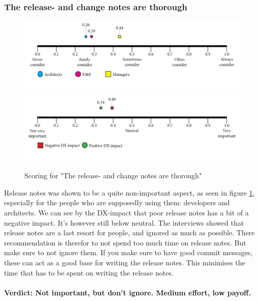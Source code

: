 \documentclass{article}
\begin{document}
\subsubsection{The release- and change notes are thorough}
\begin{figure}[H]
\centering
\includegraphics[width=\linewidth]{scorelines/aspect10.png}
\includegraphics[width=\linewidth]{dxscorelines/dxaspect10.png}
\caption{Scoring for "The release- and change notes are thorough"}
\label{fig:aspect10}
\end{figure}
Release notes was shown to be a quite non-important aspect, as seen in figure \ref{fig:aspect10}, especially for the people who are supposedly using them: developers and architects. We can see by the DX-impact that poor release notes has a bit of a negative impact. It's however still below neutral. The interviews showed that release notes are a last resort for people, and ignored as much as possible. There recommendation is therefor to not spend too much time on release notes. But make sure to not ignore them. If you make sure to have good commit messages, these can act as a good base for writing the release notes. This minimises the time that has to be spent on writing the release notes.\\ \\
\textbf{Verdict: Not important, but don't ignore. Medium effort, low payoff.}
\end{document}
